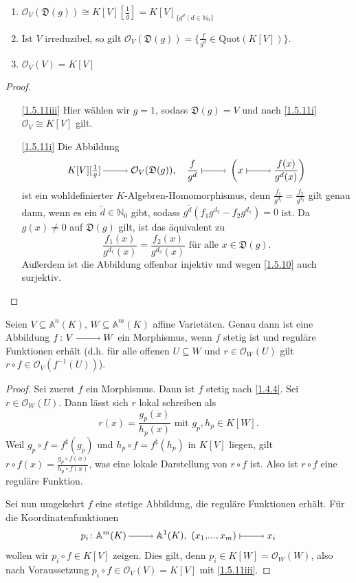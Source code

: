\documentclass[a4paper,12pt]{scrbook}
\newtheorem{proof}{Beweis}
\def\A{\mathbb{A}}
\def\O{\mathcal{O}}
\newcommand{\D}{\mathfrak{D}}
\newcommand{\Quot}{\mathrm{Quot}}
\renewcommand{\dotsc}{\ensuremath{\!...}}
\newcommand{\set}[1]{\ensuremath{\mathbb{#1}}}
\newcommand{\N}{\set{N}}
\newcommand{\ra}{\raisebox{-1pt}{\tikz{\draw[thin,shorten >=3pt, ->] (0,0) node{\hspace*{-2pt}} -- node{} (1,0);}}\penalty1000\relax}
\renewcommand{\mapsto}{\raisebox{-1pt}{\tikz{\draw[thin,shorten >=3pt, |->] (0,0) node{\hspace*{0pt}} -- node{} (1,0);}}\penalty1000\relax}
\begin{document}
\begin{kor}\label{1.5.11}
  \begin{enumerate}
  \item{} $\O_V(\D(g))\cong K[V][\frac1g] = K[V]_{\{g^d\mid d\in\N_0\}}$
  \item{} Ist $V$ irreduzibel, so gilt $\O_V(\D(g))=\{\frac{f}{g^d}\in\Quot(K[V])\}$.
  \item{} $\O_V(V)=K[V]$
  \end{enumerate}
\end{kor}
\begin{proof}
  \begin{enumerate}
  \item[\ref{1.5.11iii}] Hier wählen wir $g=1$, sodass $\D(g)=V$ und nach \ref{1.5.11i} $\O_V\cong K[V]$ gilt.
  \item[\ref{1.5.11i}] Die Abbildung
    \[K[V][\textstyle\frac1g]\ra\O_V(\D(g)),\quad \displaystyle\frac{f}{g^d}\mapsto\left(x\mapsto\frac{f(x)}{g^d(x)}\right) \]
    ist ein wohldefinierter $K$-Algebren-Homomorphismus, denn $\frac{f_1}{g^{d_1}}=\frac{f_2}{g^{d_2}}$ gilt genau dann, wenn es
    ein $\tilde{d}\in\N_0$ gibt, sodass $g^{\tilde{d}}(f_1g^{d_2}-f_2g^{d_1})=0$ ist. Da $g(x)\neq0$ auf $\D(g)$ gilt, ist das
    äquivalent zu \[\frac{f_1(x)}{g^{d_1}(x)}=\frac{f_2(x)}{g^{d_2}(x)}\text{ für alle }x\in \D(g).\] Außerdem ist die Abbildung
    offenbar injektiv und wegen \cref{1.5.10} auch surjektiv.
  \end{enumerate}
\end{proof}

\begin{prop}\label{1.5.12}
  Seien $V\subseteq\A^n(K)$, $W\subseteq\A^m(K)$ affine Varietäten. Genau dann ist eine Abbildung $f\colon V\ra W$ ein
  Morphismus, wenn $f$ stetig ist und reguläre Funktionen erhält (d.h. für alle offenen $U\subseteq W$ und $r\in\O_W(U)$ gilt
  $r\circ f\in\O_V(f^{-1}(U))$).
\end{prop}
\begin{proof}
  Sei zuerst $f$ ein Morphismus. Dann ist $f$ stetig nach \cref{1.4.4}. Sei $r\in\O_W(U)$. Dann lässt sich $r$ lokal
  schreiben als \[r(x)=\frac{g_p(x)}{h_p(x)}\text{ mit }g_p,h_p\in K[W].\] Weil $g_p\circ f=f^\sharp(g_p)$ und $h_p\circ
  f=f^\sharp(h_p)$ in $K[V]$ liegen, gilt $r\circ f(x)=\frac{g_p\circ f(x)}{h_p\circ f(x)}$, was eine lokale Darstellung von
  $r\circ f$ ist. Also ist $r\circ f$ eine reguläre Funktion.

  Sei nun umgekehrt $f$ eine stetige Abbildung, die reguläre Funktionen erhält. Für die Koordinatenfunktionen \[p_i\colon
  \A^m(K)\ra \A^1(K),\ (x_1,\dotsc,x_m)\mapsto x_i\] wollen wir $p_i\circ f\in K[V]$ zeigen. Dies gilt, denn $p_i\in K[W] =
  \O_W(W)$, also nach Voraussetzung $p_i\circ f\in\O_V(V)=K[V]$ mit \cref{1.5.11iii}.
\end{proof}
\end{document}
